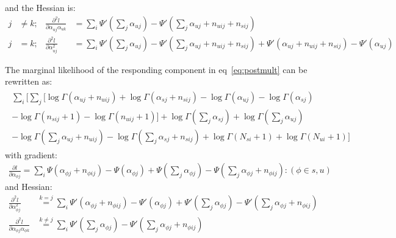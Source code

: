 \documentclass[11pt]{article}
\begin{document}
and the Hessian is:
\begin{align}
j&\ne k; &\frac{\partial^2 l}{\partial \alpha_{uj}\alpha_{uk}} & = \sum_i \Psi'(\sum_j\alpha_{uj})-\Psi'(\sum_j\alpha_{uj}+n_{uij}+n_{sij})\\
j&=k;&\frac{\partial^2l}{\partial \alpha_{uj}^2} &= \sum_i \Psi'(\sum_j\alpha_{uj})-\Psi'(\sum_j\alpha_{uj}+n_{uij}+n_{sij})+\Psi'(\alpha_{uj}+n_{uij}+n_{sij})-\Psi'(\alpha_{uj})
\end{align}

The marginal likelihood of the responding component in eq~\ref{eq:postmult} can be rewritten as:
\begin{align}
\begin{split}
\sum_i\bigg[\sum_j \big[ \log\Gamma(\alpha_{uj}+n_{uij})+\log\Gamma(\alpha_{sj}+n_{sij}) -\log\Gamma(\alpha_{uj}) -\log\Gamma(\alpha_{sj})\\
-\log\Gamma(n_{sij}+1)-\log\Gamma(n_{uij}+1)\big]+\log\Gamma(\sum_j\alpha_{sj})+\log\Gamma(\sum_j\alpha_{uj})\\
-\log\Gamma(\sum_j\alpha_{uj}+n_{uij})-\log\Gamma(\sum_j\alpha_{sj}+n_{sij})+\log\Gamma(N_{si}+1)+\log\Gamma(N_{ui}+1)\bigg]
\end{split}
\end{align}
with gradient:
\begin{align}
\frac{\partial l}{\partial\alpha_{\phi j}} = \sum_i \Psi(\alpha_{\phi j}+n_{\phi ij})-\Psi(\alpha_{\phi j})+\Psi(\sum_j \alpha_{\phi j}) - \Psi(\sum_j \alpha_{\phi j}+n_{\phi ij}): (\phi \in {s,u})
\end{align}
and Hessian:
\begin{align}
\frac{\partial^2l}{\partial \alpha_{\phi j}^2}& \overset {k=j}{=}\sum_i \Psi'(\alpha_{\phi j}+n_{\phi ij}) - \Psi'(\alpha_{\phi j}) + \Psi'(\sum_j \alpha_{\phi j}) - \Psi'(\sum_j\alpha_{\phi j}+n_{\phi ij})\\
\frac{\partial^2l}{\partial \alpha_{\phi j}\alpha_{\phi k}}&\overset{k\ne j}{=}\sum_i\Psi'(\sum_j \alpha_{\phi j}) - \Psi'(\sum_j\alpha_{\phi j}+n_{\phi ij})
\end{align}
\end{document}
